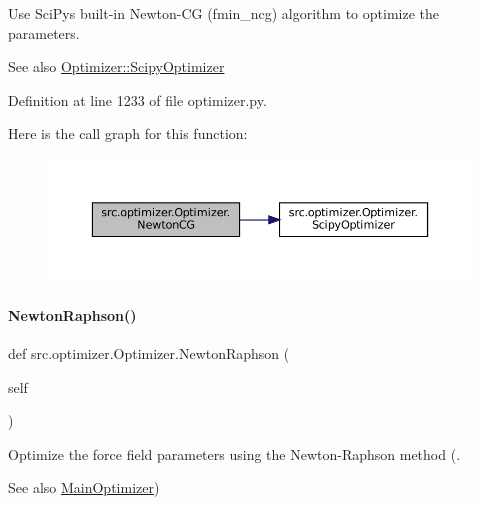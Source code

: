 Use Sci\+Py\textquotesingle{}s built-\/in Newton-\/\+CG (fmin\+\_\+ncg) algorithm to optimize the parameters. 

\begin{DoxySeeAlso}{See also}
\hyperlink{classsrc_1_1optimizer_1_1Optimizer_a1e616a4c920b3e8935ca19e208b1c3be}{Optimizer\+::\+Scipy\+Optimizer} 
\end{DoxySeeAlso}


Definition at line 1233 of file optimizer.\+py.

Here is the call graph for this function\+:
\nopagebreak
\begin{figure}[H]
\begin{center}
\leavevmode
\includegraphics[width=350pt]{classsrc_1_1optimizer_1_1Optimizer_aa1a6d36bfd020d4eb2d0fb238777d369_cgraph}
\end{center}
\end{figure}
\mbox{\label{classsrc_1_1optimizer_1_1Optimizer_aee3a09f71220a784ef9541ce54270711}} 
\paragraph{\texorpdfstring{Newton\+Raphson()}{NewtonRaphson()}}
{\footnotesize\ttfamily def src.\+optimizer.\+Optimizer.\+Newton\+Raphson (\begin{DoxyParamCaption}\item[{}]{self }\end{DoxyParamCaption})}



Optimize the force field parameters using the Newton-\/\+Raphson method (. 

\begin{DoxySeeAlso}{See also}
\hyperlink{classsrc_1_1optimizer_1_1Optimizer_a30443d919712b0f3529de3c7d62619ca}{Main\+Optimizer}) 
\end{DoxySeeAlso}


